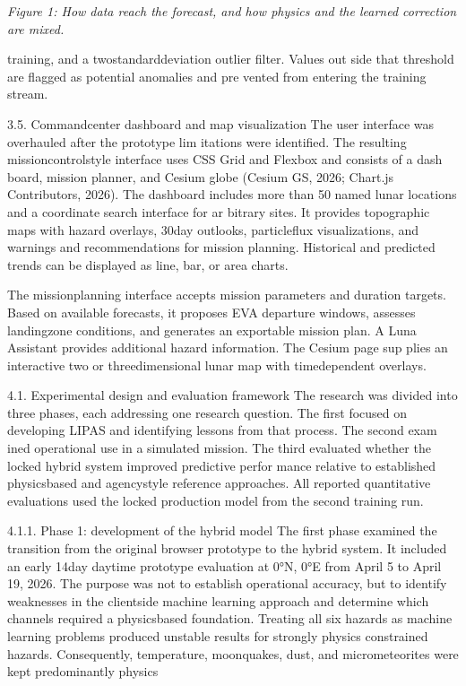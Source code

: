 \emph{Figure 1: How data reach the forecast, and how physics and the learned correction are mixed.}

training, and a twostandarddeviation outlier filter. Values out side that threshold are flagged as potential anomalies and pre vented from entering the training stream.

3.5. Commandcenter dashboard and map visualization The user interface was overhauled after the prototype lim itations were identified. The resulting missioncontrolstyle interface uses CSS Grid and Flexbox and consists of a dash board, mission planner, and Cesium globe (Cesium GS, 2026; Chart.js Contributors, 2026). The dashboard includes more than 50 named lunar locations and a coordinate search interface for ar bitrary sites. It provides topographic maps with hazard overlays, 30day outlooks, particleflux visualizations, and warnings and recommendations for mission planning. Historical and predicted trends can be displayed as line, bar, or area charts.

The missionplanning interface accepts mission parameters and duration targets. Based on available forecasts, it proposes EVA departure windows, assesses landingzone conditions, and generates an exportable mission plan. A Luna Assistant provides additional hazard information. The Cesium page sup plies an interactive two or threedimensional lunar map with timedependent overlays.

4.1. Experimental design and evaluation framework The research was divided into three phases, each addressing one research question. The first focused on developing LIPAS and identifying lessons from that process. The second exam ined operational use in a simulated mission. The third evaluated whether the locked hybrid system improved predictive perfor mance relative to established physicsbased and agencystyle reference approaches. All reported quantitative evaluations used the locked production model from the second training run.

4.1.1. Phase 1: development of the hybrid model The first phase examined the transition from the original browser prototype to the hybrid system. It included an early 14day daytime prototype evaluation at 0°N, 0°E from April 5 to April 19, 2026. The purpose was not to establish operational accuracy, but to identify weaknesses in the clientside machine learning approach and determine which channels required a physicsbased foundation. Treating all six hazards as machine learning problems produced unstable results for strongly physics constrained hazards. Consequently, temperature, moonquakes, dust, and micrometeorites were kept predominantly physics

